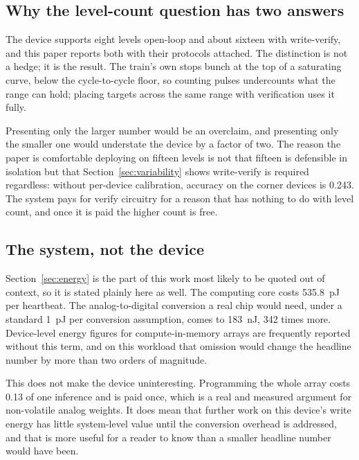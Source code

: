 \subsection{Why the level-count question has two answers}

The device supports eight levels open-loop and about sixteen with write-verify, and this
paper reports both with their protocols attached. The distinction is not a hedge; it is
the result. The train's own stops bunch at the top of a saturating curve, below the
cycle-to-cycle floor, so counting pulses undercounts what the range can hold; placing
targets across the same range with verification uses it fully.

Presenting only the larger number would be an overclaim, and presenting only the smaller
one would understate the device by a factor of two. The reason the paper is comfortable
deploying on fifteen levels is not that fifteen is defensible in isolation but that
Section~\ref{sec:variability} shows write-verify is required regardless: without per-device
calibration, accuracy on the corner devices is \num{0.243}. The system pays for verify
circuitry for a reason that has nothing to do with level count, and once it is paid the
higher count is free.

\subsection{The system, not the device}

Section~\ref{sec:energy} is the part of this work most likely to be quoted out of context,
so it is stated plainly here as well. The computing core costs
\SI{535.8}{\pico\joule} per heartbeat. The analog-to-digital conversion a real chip would
need, under a standard \SI{1}{\pico\joule} per conversion assumption, comes to
\SI{183}{\nano\joule}, \num{342} times more. Device-level energy figures for
compute-in-memory arrays are frequently reported without this term, and on this workload
that omission would change the headline number by more than two orders of magnitude.

This does not make the device uninteresting. Programming the whole array costs
\num{0.13} of one inference and is paid once, which is a real and measured argument for
non-volatile analog weights. It does mean that further work on this device's write energy
has little system-level value until the conversion overhead is addressed, and that is more
useful for a reader to know than a smaller headline number would have been.


